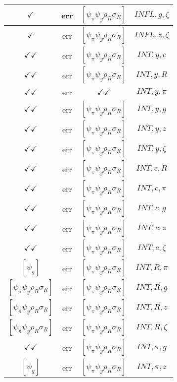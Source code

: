 \documentclass[a4paper,10pt]{article}
\begin{document}
\begin{longtable}{|c|c|c|c|}
\hline
$\checkmark$ & err & $[\psi_\pi \psi_y \rho_R \sigma_R ]$ & ${INFL},{g},{\zeta}$ \\
\hline
$\checkmark$ & err & $[\psi_\pi \psi_y \rho_R \sigma_R ]$ & ${INFL},{z},{\zeta}$ \\
\hline
$\checkmark\checkmark$ & err & $[\psi_\pi \psi_y \rho_R \sigma_R ]$ & ${INT},{y},{c}$ \\
\hline
$\checkmark\checkmark$ & err & $[\psi_\pi \psi_y \rho_R \sigma_R ]$ & ${INT},{y},{R}$ \\
\hline
$\checkmark\checkmark$ & err & $\checkmark\checkmark$ & ${INT},{y},{\pi}$ \\
\hline
$\checkmark\checkmark$ & err & $[\psi_\pi \psi_y \rho_R \sigma_R ]$ & ${INT},{y},{g}$ \\
\hline
$\checkmark\checkmark$ & err & $[\psi_\pi \psi_y \rho_R \sigma_R ]$ & ${INT},{y},{z}$ \\
\hline
$\checkmark\checkmark$ & err & $[\psi_\pi \psi_y \rho_R \sigma_R ]$ & ${INT},{y},{\zeta}$ \\
\hline
$\checkmark\checkmark$ & err & $[\psi_\pi \psi_y \rho_R \sigma_R ]$ & ${INT},{c},{R}$ \\
\hline
$\checkmark\checkmark$ & err & $[\psi_\pi \psi_y \rho_R \sigma_R ]$ & ${INT},{c},{\pi}$ \\
\hline
$\checkmark\checkmark$ & err & $[\psi_\pi \psi_y \rho_R \sigma_R ]$ & ${INT},{c},{g}$ \\
\hline
$\checkmark\checkmark$ & err & $[\psi_\pi \psi_y \rho_R \sigma_R ]$ & ${INT},{c},{z}$ \\
\hline
$\checkmark\checkmark$ & err & $[\psi_\pi \psi_y \rho_R \sigma_R ]$ & ${INT},{c},{\zeta}$ \\
\hline
$[\psi_y ]$ & err & $[\psi_\pi \psi_y \rho_R \sigma_R ]$ & ${INT},{R},{\pi}$ \\
\hline
$[\psi_\pi \psi_y \rho_R \sigma_R ]$ & err & $[\psi_\pi \psi_y \rho_R \sigma_R ]$ & ${INT},{R},{g}$ \\
\hline
$[\psi_\pi \psi_y \rho_R \sigma_R ]$ & err & $[\psi_\pi \psi_y \rho_R \sigma_R ]$ & ${INT},{R},{z}$ \\
\hline
$[\psi_\pi \psi_y \rho_R \sigma_R ]$ & err & $[\psi_\pi \psi_y \rho_R \sigma_R ]$ & ${INT},{R},{\zeta}$ \\
\hline
$\checkmark\checkmark$ & err & $[\psi_\pi \psi_y \rho_R \sigma_R ]$ & ${INT},{\pi},{g}$ \\
\hline
$[\psi_y ]$ & err & $[\psi_\pi \psi_y \rho_R \sigma_R ]$ & ${INT},{\pi},{z}$ \\

\end{longtable}
\end{document}
